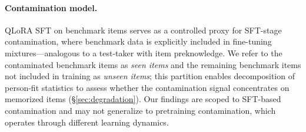 \paragraph{Contamination model.}
QLoRA SFT on benchmark items serves as a controlled proxy for SFT-stage contamination, where benchmark data is explicitly included in fine-tuning mixtures---analogous to a test-taker with item preknowledge.
We refer to the contaminated benchmark items as \emph{seen items} and the remaining benchmark items not included in training as \emph{unseen items}; this partition enables decomposition of person-fit statistics to assess whether the contamination signal concentrates on memorized items (\S\ref{sec:degradation}).
Our findings are scoped to SFT-based contamination and may not generalize to pretraining contamination, which operates through different learning dynamics.
